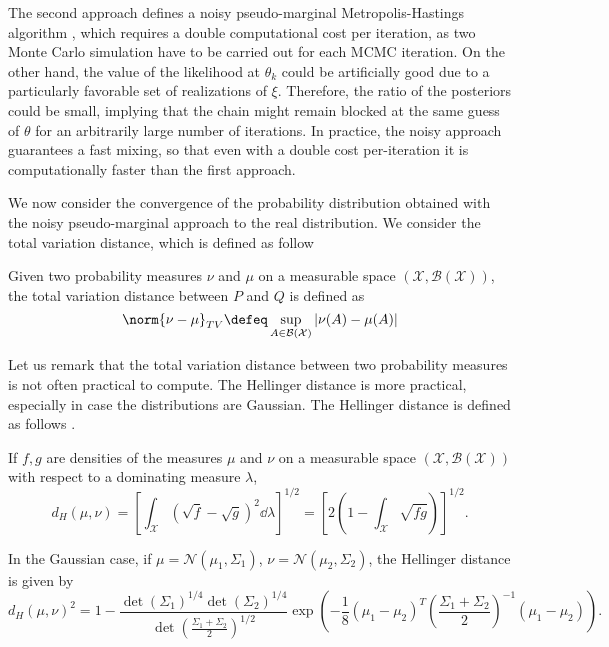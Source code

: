 The second approach defines a noisy pseudo-marginal Metropolis-Hastings algorithm \cite{AnR09, MLR16, OBB00}, which requires a double computational cost per iteration, as two Monte Carlo simulation have to be carried out for each MCMC iteration. On the other hand, the value of the likelihood at $\theta_k$ could be artificially good due to a particularly favorable set of realizations of $\xi$. Therefore, the ratio of the posteriors could be small, implying that the chain might remain blocked at the same guess of $\theta$ for an arbitrarily large number of iterations. In practice, the noisy approach guarantees a fast mixing, so that even with a double cost per-iteration it is computationally faster than the first approach. 

We now consider the convergence of the probability distribution obtained with the noisy pseudo-marginal approach to the real distribution. We consider the total variation distance, which is defined as follow \cite{GiS02}
\begin{definition} Given two probability measures $\nu$ and $\mu$ on a measurable space $(\mathcal{X}, \mathcal{B}(\mathcal{X}))$, the total variation distance between $P$ and $Q$ is defined as
\begin{equation}
	\norm{\nu-\mu}_{TV} \defeq \sup_{A\in \mathcal{B}(\mathcal{X})} \left|\nu(A) - \mu(A)\right|
\end{equation}
\end{definition}
\noindent Let us remark that the total variation distance between two probability measures is not often practical to compute. The Hellinger distance is more practical, especially in case the distributions are Gaussian. The Hellinger distance is defined as follows \cite{GiS02}.
\begin{definition} If $f, g$ are densities of the measures $\mu$ and $\nu$ on a measurable space $(\mathcal{X}, \mathcal{B}(\mathcal{X}))$ with respect to a dominating measure $\lambda$, 
\begin{equation}
	d_H(\mu, \nu) = \left[\int_{\mathcal{X}}\left(\sqrt{f} - \sqrt{g}\right)^2\dd \lambda\right]^{1/2} = \left[2\left(1-\int_{\mathcal{X}}\sqrt{fg}\right)\right]^{1/2}.
\end{equation}
\end{definition}
\noindent In the Gaussian case, if $\mu=\mathcal{N}(\mu_1, \Sigma_1)$, $\nu=\mathcal{N}(\mu_2,\Sigma_2)$, the Hellinger distance is given by
\begin{equation}
 d_H(\mu, \nu)^2 = 1 - \frac{ \det (\Sigma_1)^{1/4} \det (\Sigma_2) ^{1/4}} { \det \left( \frac{\Sigma_1 + \Sigma_2}{2}\right)^{1/2} }
 \exp\left(-\frac{1}{8}(\mu_1 - \mu_2)^T 
 \left(\frac{\Sigma_1 + \Sigma_2}{2}\right)^{-1}
 (\mu_1 - \mu_2)              
 \right).
\end{equation} 
